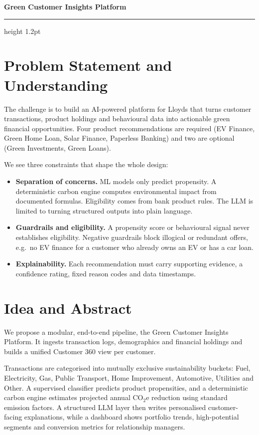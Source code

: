 \documentclass[11pt,a4paper]{article}
\begin{document}
\vspace{0.6em}

\begin{center}
{\LARGE\bfseries\textcolor{green!40!black}{Green Customer Insights Platform}}
\end{center}

\vspace{1.3em}
{\color{green!45!black}\hrule height 1.2pt}
\vspace{0.5em}

\section{Problem Statement and Understanding}
The challenge is to build an AI-powered platform for Lloyds that turns customer transactions, product holdings and behavioural data into actionable green financial opportunities. Four product recommendations are required (EV Finance, Green Home Loan, Solar Finance, Paperless Banking) and two are optional (Green Investments, Green Loans).

We see three constraints that shape the whole design:
\begin{itemize}
  \item \textbf{Separation of concerns.} ML models only predict propensity. A deterministic carbon engine computes environmental impact from documented formulas. Eligibility comes from bank product rules. The LLM is limited to turning structured outputs into plain language.
  \item \textbf{Guardrails and eligibility.} A propensity score or behavioural signal never establishes eligibility. Negative guardrails block illogical or redundant offers, e.g.\ no EV finance for a customer who already owns an EV or has a car loan.
  \item \textbf{Explainability.} Each recommendation must carry supporting evidence, a confidence rating, fixed reason codes and data timestamps.
\end{itemize}

\section{Idea and Abstract}
We propose a modular, end-to-end pipeline, the Green Customer Insights Platform. It ingests transaction logs, demographics and financial holdings and builds a unified Customer 360 view per customer.

Transactions are categorised into mutually exclusive sustainability buckets: Fuel, Electricity, Gas, Public Transport, Home Improvement, Automotive, Utilities and Other. A supervised classifier predicts product propensities, and a deterministic carbon engine estimates projected annual CO$_2$e reduction using standard emission factors. A structured LLM layer then writes personalised customer-facing explanations, while a dashboard shows portfolio trends, high-potential segments and conversion metrics for relationship managers.
\end{document}
